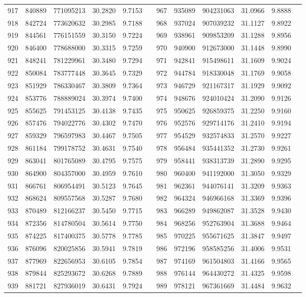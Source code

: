 \begin{longtable}{SSSSSSSSSSSS}
917&840889&771095213&30.2820&9.7153&&967&935089&904231063&31.0966&9.8888\\
918&842724&773620632&30.2985&9.7188&&968&937024&907039232&31.1127&9.8922\\
919&844561&776151559&30.3150&9.7224&&969&938961&909853209&31.1288&9.8956\\
920&846400&778688000&30.3315&9.7259&&970&940900&912673000&31.1448&9.8990\\
921&848241&781229961&30.3480&9.7294&&971&942841&915498611&31.1609&9.9024\\
922&850084&783777448&30.3645&9.7329&&972&944784&918330048&31.1769&9.9058\\
923&851929&786330467&30.3809&9.7364&&973&946729&921167317&31.1929&9.9092\\
924&853776&788889024&30.3974&9.7400&&974&948676&924010424&31.2090&9.9126\\
925&855625&791453125&30.4138&9.7435&&975&950625&926859375&31.2250&9.9160\\
926&857476&794022776&30.4302&9.7470&&976&952576&929714176&31.2410&9.9194\\
927&859329&796597983&30.4467&9.7505&&977&954529&932574833&31.2570&9.9227\\
928&861184&799178752&30.4631&9.7540&&978&956484&935441352&31.2730&9.9261\\
929&863041&801765089&30.4795&9.7575&&979&958441&938313739&31.2890&9.9295\\
930&864900&804357000&30.4959&9.7610&&980&960400&941192000&31.3050&9.9329\\
931&866761&806954491&30.5123&9.7645&&981&962361&944076141&31.3209&9.9363\\
932&868624&809557568&30.5287&9.7680&&982&964324&946966168&31.3369&9.9396\\
933&870489&812166237&30.5450&9.7715&&983&966289&949862087&31.3528&9.9430\\
934&872356&814780504&30.5614&9.7750&&984&968256&952763904&31.3688&9.9464\\
935&874225&817400375&30.5778&9.7785&&985&970225&955671625&31.3847&9.9497\\
936&876096&820025856&30.5941&9.7819&&986&972196&958585256&31.4006&9.9531\\
937&877969&822656953&30.6105&9.7854&&987&974169&961504803&31.4166&9.9565\\
938&879844&825293672&30.6268&9.7889&&988&976144&964430272&31.4325&9.9598\\
939&881721&827936019&30.6431&9.7924&&989&978121&967361669&31.4484&9.9632\\

\end{longtable}
